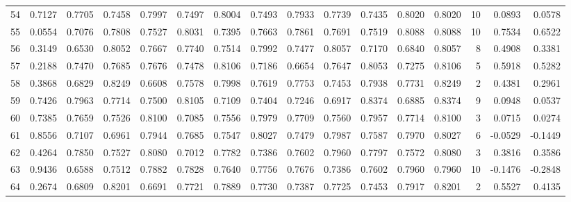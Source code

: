 \begin{tabular}{lrrrrrrrrrrrrrrr}
54  &      0.7127 &  0.7705 &  0.7458 &  0.7997 &  0.7497 &  0.8004 &  0.7493 &  0.7933 &  0.7739 &  0.7435 &   0.8020 &     0.8020 &     10 &                    0.0893 &                     0.0578 \\
55  &      0.0554 &  0.7076 &  0.7808 &  0.7527 &  0.8031 &  0.7395 &  0.7663 &  0.7861 &  0.7691 &  0.7519 &   0.8088 &     0.8088 &     10 &                    0.7534 &                     0.6522 \\
56  &      0.3149 &  0.6530 &  0.8052 &  0.7667 &  0.7740 &  0.7514 &  0.7992 &  0.7477 &  0.8057 &  0.7170 &   0.6840 &     0.8057 &      8 &                    0.4908 &                     0.3381 \\
57  &      0.2188 &  0.7470 &  0.7685 &  0.7676 &  0.7478 &  0.8106 &  0.7186 &  0.6654 &  0.7647 &  0.8053 &   0.7275 &     0.8106 &      5 &                    0.5918 &                     0.5282 \\
58  &      0.3868 &  0.6829 &  0.8249 &  0.6608 &  0.7578 &  0.7998 &  0.7619 &  0.7753 &  0.7453 &  0.7938 &   0.7731 &     0.8249 &      2 &                    0.4381 &                     0.2961 \\
59  &      0.7426 &  0.7963 &  0.7714 &  0.7500 &  0.8105 &  0.7109 &  0.7404 &  0.7246 &  0.6917 &  0.8374 &   0.6885 &     0.8374 &      9 &                    0.0948 &                     0.0537 \\
60  &      0.7385 &  0.7659 &  0.7526 &  0.8100 &  0.7085 &  0.7556 &  0.7979 &  0.7709 &  0.7560 &  0.7957 &   0.7714 &     0.8100 &      3 &                    0.0715 &                     0.0274 \\
61  &      0.8556 &  0.7107 &  0.6961 &  0.7944 &  0.7685 &  0.7547 &  0.8027 &  0.7479 &  0.7987 &  0.7587 &   0.7970 &     0.8027 &      6 &                   -0.0529 &                    -0.1449 \\
62  &      0.4264 &  0.7850 &  0.7527 &  0.8080 &  0.7012 &  0.7782 &  0.7386 &  0.7602 &  0.7960 &  0.7797 &   0.7572 &     0.8080 &      3 &                    0.3816 &                     0.3586 \\
63  &      0.9436 &  0.6588 &  0.7512 &  0.7882 &  0.7828 &  0.7640 &  0.7756 &  0.7676 &  0.7386 &  0.7602 &   0.7960 &     0.7960 &     10 &                   -0.1476 &                    -0.2848 \\
64  &      0.2674 &  0.6809 &  0.8201 &  0.6691 &  0.7721 &  0.7889 &  0.7730 &  0.7387 &  0.7725 &  0.7453 &   0.7917 &     0.8201 &      2 &                    0.5527 &                     0.4135 \\

\end{tabular}
